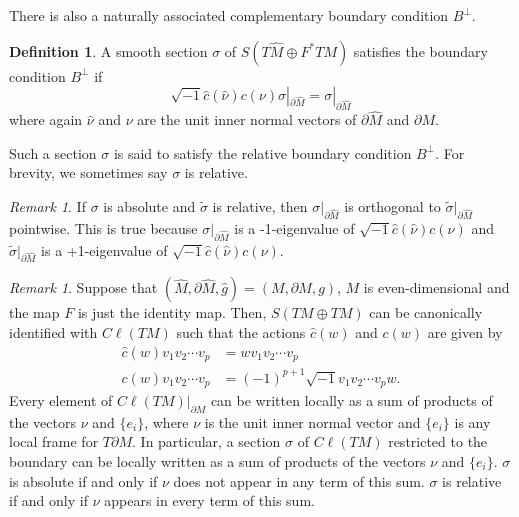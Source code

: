 \documentclass[12pt, reqno]{amsart}
\theoremstyle{plain} %
\theoremstyle{definition}
\newtheorem{definition}[theorem]{Definition}
\theoremstyle{remark}
\newtheorem{remark}[theorem]{Remark}
\numberwithin{equation}{section}
\newcommand{\dom}[1]{\hat{#1}}
\newcommand{\bnd}[1]{\partial #1}
\newcommand{\cbar}[1]{\dom{c}\left(#1\right)}
\newcommand{\Cl}{C\ell}
\begin{document}
There is also a naturally associated complementary boundary condition \(B^{\perp}\).
\begin{definition}
    A smooth section \(\sigma\) of \(S(T\dom{M} \oplus F^*TM)\) satisfies the boundary condition \(B^{\perp}\) if
    \begin{equation*}
        \sqrt{-1}\cbar{\dom{\nu}} c(\nu) \sigma|_{\bnd{\dom{M}}} = \sigma|_{\bnd{\dom{M}}}
    \end{equation*}
    where again \(\dom{\nu}\) and \(\nu\) are the unit inner normal vectors of \(\bnd{\dom{M}}\) and \(\bnd{M}\).

    Such a section \(\sigma\) is said to satisfy the relative boundary condition \(B^\perp\).
    For brevity, we sometimes say \(\sigma\) is relative.
\end{definition}
\begin{remark}
    If \(\sigma\) is absolute and \(\tilde{\sigma}\) is relative, then \(\sigma|_{\bnd{\dom{M}}}\) is orthogonal to \(\tilde{\sigma}|_{\bnd{\dom{M}}}\) pointwise.
    This is true because \(\sigma|_{\bnd{\dom{M}}}\) is a -1-eigenvalue of \(\sqrt{-1}\cbar{\dom{\nu}} c(\nu)\) and \(\tilde{\sigma}|_{\bnd{\dom{M}}}\) is a +1-eigenvalue of \(\sqrt{-1}\cbar{\dom{\nu}} c(\nu)\).
\end{remark}
\begin{remark}\label{rem:boundary conditions in case of clifford bundle}
    Suppose that \((\dom{M}, \bnd{\dom{M}}, \dom{g}) = (M, \bnd{M}, g)\), \(M\) is even-dimensional and the map \(F\) is just the identity map.
    Then, \(S(TM \oplus TM)\) can be canonically identified with \(\Cl(TM)\) such that the actions \(\dom{c}(w)\) and \(c(w)\) are given by
    \begin{align*}
        \dom{c}(w) v_1 v_2 \dotsm v_p &= w v_1 v_2 \dotsm v_p \\
        c(w) v_1 v_2 \dotsm v_p &= (-1)^{p+1} \sqrt{-1}v_1 v_2 \dotsm v_p w.
    \end{align*}
    Every element of \(\Cl(TM)|_{\bnd{M}}\) can be written locally as a sum of products of the vectors \(\nu\) and \(\{e_i\}\), where \(\nu\) is the unit inner normal vector and \(\{e_i\}\) is any local frame for \(T\bnd{M}\).
    In particular, a section \(\sigma\) of \(\Cl(TM)\) restricted to the boundary can be locally written as a sum of products of the vectors \(\nu\) and \(\{e_i\}\).
    \(\sigma\) is absolute if and only if \(\nu\) does not appear in any term of this sum.
    \(\sigma\) is relative if and only if \(\nu\) appears in every term of this sum.
\end{remark}
\end{document}
